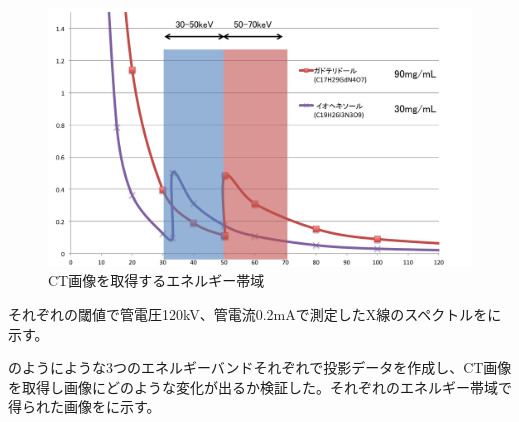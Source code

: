 \begin{figure}[H]
 \begin{center}
 \includegraphics[bb=0.000000 0.000000 640.747032 391.647624,width=0.8\hsize]{image2/chapter5/K-edge_window.png} 
 \end{center}
 \caption{CT画像を取得するエネルギー帯域}
 \label{fig:K-edge_window}
\end{figure}


それぞれの閾値で管電圧120kV、管電流0.2mAで測定したX線のスペクトルをに示す。



のようにような3つのエネルギーバンドそれぞれで投影データを作成し、CT画像を取得し画像にどのような変化が出るか検証した。それぞれのエネルギー帯域で得られた画像をに示す。

